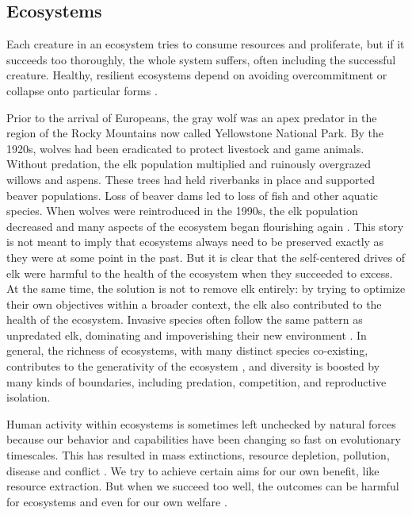 \documentclass[12pt]{article}
\begin{document}
\subsection{Ecosystems}

Each creature in an ecosystem tries to consume resources and proliferate, but if it succeeds too thoroughly, the whole system suffers, often including the successful creature. Healthy, resilient ecosystems depend on avoiding overcommitment or collapse onto particular forms \citep{holling1973resilience, yachi1999biodiversity, tilman1996biodiversity}.

Prior to the arrival of Europeans, the gray wolf was an apex predator in the region of the Rocky Mountains now called Yellowstone National Park. By the 1920s, wolves had been eradicated to protect livestock and game animals. Without predation, the elk population multiplied and ruinously overgrazed willows and aspens. These trees had held riverbanks in place and supported beaver populations. Loss of beaver dams led to loss of fish and other aquatic species. When wolves were reintroduced in the 1990s, the elk population decreased and many aspects of the ecosystem began flourishing again \citep{ripple2012trophic}. This story is not meant to imply that ecosystems always need to be preserved exactly as they were at some point in the past. But it is clear that the self-centered drives of elk were harmful to the health of the ecosystem when they succeeded to excess. At the same time, the solution is not to remove elk entirely: by trying to optimize their own objectives within a broader context, the elk also contributed to the health of the ecosystem. Invasive species often follow the same pattern as unpredated elk, dominating and impoverishing their new environment \citep{pimentel2005update}. In general, the richness of ecosystems, with many distinct species co-existing, contributes to the generativity of the ecosystem \citep{hutchinson1959homage, tilman1982resource, schluter2000ecology, seehausen2014genomics}, and diversity is boosted by many kinds of boundaries, including predation, competition, and reproductive isolation. 




Human activity within ecosystems is sometimes left unchecked by natural forces because our behavior and capabilities have been changing so fast on evolutionary timescales. This has resulted in mass extinctions, resource depletion, pollution, disease and conflict \citep{ceballos2015accelerated, kolbert2014sixth, rockstrom2009safe}. We try to achieve certain aims for our own benefit, like resource extraction. But when we succeed too well, the outcomes can be harmful for ecosystems and even for our own welfare \citep{shiva1993monocultures, bateson1972steps}.
\end{document}
